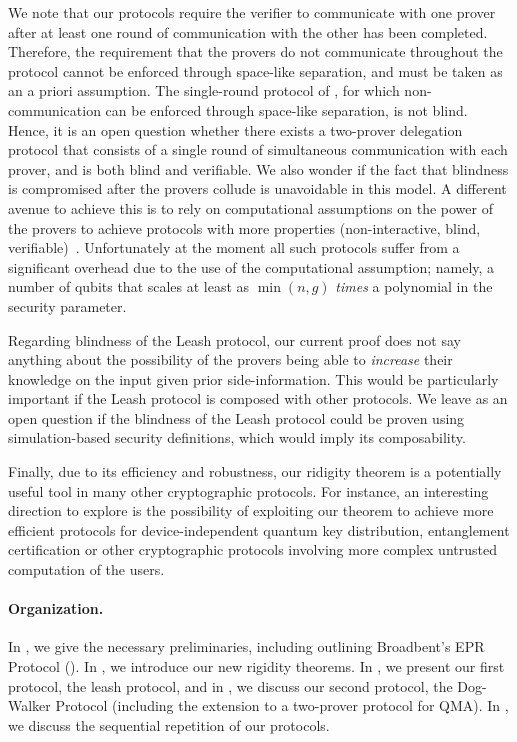 \documentclass{toc}
\begin{document}
We note that our protocols require the verifier to communicate with one
prover after at least one round of communication with the other has been
completed. Therefore, the requirement that the provers do not
communicate throughout the protocol cannot be enforced through space-like
separation, and must be taken as an a priori assumption.
The single-round protocol of \cite{Grilo17}, for which non-communication can be enforced through space-like separation, is not blind. Hence, it is an open question
whether there exists a two-prover
delegation protocol that consists of a single round of simultaneous
communication with each prover, and is both blind and verifiable. 
We also wonder if the fact that blindness is compromised after the provers
collude is unavoidable in this model.
A different
avenue to achieve this is to rely on computational assumptions on the power of
the provers to achieve protocols with more properties (non-interactive, blind,
verifiable)~\cite{dulek16,alagic2017quantum,mahadev2017,mahadev2018}. Unfortunately at the moment all such protocols suffer from a significant overhead due to the use of the computational assumption; namely, a number of qubits that scales at least as $\min(n,g)$ \emph{times} a polynomial in the security parameter. 

Regarding blindness of the Leash protocol, our current proof does not say anything about the possibility of the provers being able to \emph{increase} their knowledge on the input given prior side-information. This would be particularly important if the Leash protocol is composed with other protocols. We leave as an open question if the blindness of the Leash protocol could be proven using simulation-based security definitions, which would imply its composability.


Finally, due to its efficiency and robustness, our ridigity theorem is a
potentially useful tool in many other cryptographic protocols. For instance, an
interesting direction to explore is the possibility of exploiting our theorem to
achieve more efficient protocols for device-independent quantum key
distribution, entanglement certification or other cryptographic protocols
involving more complex untrusted computation of the users.




\paragraph{Organization.}
In , we give the necessary preliminaries, including
outlining Broadbent's EPR Protocol (). In
, we introduce our new rigidity theorems. In
, we present our first protocol, the leash protocol, and in
, we discuss our second protocol, the
Dog-Walker Protocol (including the extension to a two-prover protocol for QMA). In , we discuss the sequential repetition of our protocols.
\end{document}
